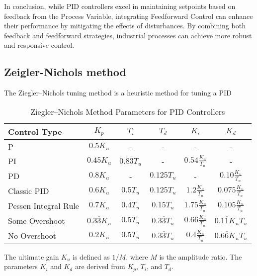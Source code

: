 In conclusion, while PID controllers excel in maintaining setpoints based on
feedback from the Process Variable, integrating Feedforward Control can enhance
their performance by mitigating the effects of disturbances. By combining both
feedback and feedforward strategies, industrial processes can achieve more
robust and responsive control.

\subsection{Zeigler-Nichols method}
The Ziegler--Nichols tuning method is a heuristic method for tuning a PID


\begin{table}[ht]
    \centering
    \caption{Ziegler--Nichols Method Parameters for PID Controllers}
    \label{tab:ziegler-nichols}
    \begin{tabular}{|l|c|c|c|c|c|}
        \hline
        Control Type         & \( K_p \)                  & \( T_i \)                  & \( T_d \)                   & \( K_i \)                              & \( K_d \)                      \\
        \hline
        P                    & \( 0.5 K_u \)              & -                          & -                           & -                                      & -                              \\
        PI                   & \( 0.45 K_u \)             & \( 0.8 \overline{3} T_u \) & -                           & \( 0.54 \frac{K_u}{T_u} \)             & -                              \\
        PD                   & \( 0.8 K_u \)              & -                          & \( 0.125 T_u \)             & -                                      & \( 0.10 \frac{K_u}{T_u} \)     \\
        Classic PID          & \( 0.6 K_u \)              & \( 0.5 T_u \)              & \( 0.125 T_u \)             & \( 1.2 \frac{K_u}{T_u} \)              & \( 0.075 \frac{K_u}{T_u} \)    \\
        Pessen Integral Rule & \( 0.7 K_u \)              & \( 0.4 T_u \)              & \( 0.15 T_u \)              & \( 1.75 \frac{K_u}{T_u} \)             & \( 0.105 \frac{K_u}{T_u} \)    \\
        Some Overshoot       & \( 0.3 \overline{3} K_u \) & \( 0.5 T_u \)              & \( 0.3 \overline{3}{T_u} \) & \( 0.6 \overline{6} \frac{K_u}{T_u} \) & \( 0.1 \overline{1} K_u T_u \) \\
        No Overshoot         & \( 0.2 K_u \)              & \( 0.5 T_u \)              & \( 0.3 \overline{3}{T_u} \) & \( 0.4 \frac{K_u}{T_u} \)              & \( 0.6 \overline{6} K_u T_u \) \\
        \hline
    \end{tabular}
\end{table}

The ultimate gain \( K_u \) is defined as \( 1/M \), where \( M \) is the
amplitude ratio. The parameters \( K_i \) and \( K_d \) are derived from \( K_p
\), \( T_i \), and \( T_d \).
